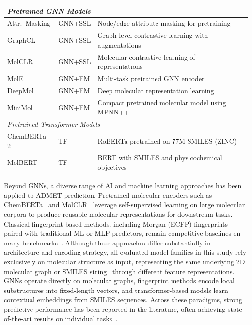 \documentclass[journal]{IEEEtran}
\begin{document}
\begin{table}[!t]
\begin{tabular}{llp{5.5cm}l}
\midrule
\multicolumn{4}{l}{\emph{Pretrained GNN Models}} \\
\midrule
Attr.\ Masking & GNN+SSL & Node/edge attribute masking for pretraining & \cite{attrMasking} \\
GraphCL & GNN+SSL & Graph-level contrastive learning with augmentations & \cite{contrativeLearning} \\
MolCLR & GNN+SSL & Molecular contrastive learning of representations & \cite{molclr} \\
MolE & GNN+FM & Multi-task pretrained GNN encoder & \cite{molE} \\
DeepMol & GNN+FM & Deep molecular representation learning & \cite{deepMol} \\
MiniMol & GNN+FM & Compact pretrained molecular model using MPNN++ & \cite{miniMol} \\

\midrule
\multicolumn{4}{l}{\emph{Pretrained Transformer Models}} \\
\midrule
ChemBERTa-2 & TF & RoBERTa pretrained on 77M SMILES (ZINC) & \cite{chemberta2} \\
MolBERT & TF & BERT with SMILES and physicochemical objectives & \cite{molbert} \\

\bottomrule
\end{tabular}
\end{table}

Beyond GNNs, a diverse range of AI and machine learning approaches has been applied to ADMET prediction. Pretrained molecular encoders such as ChemBERTa~\cite{chemberta2} and MolCLR~\cite{molclr} leverage self-supervised learning on large molecular corpora to produce reusable molecular representations for downstream tasks. Classical fingerprint-based methods, including Morgan (ECFP) fingerprints~\cite{rogers2010ecfp} paired with traditional ML or MLP predictors, remain competitive baselines on many benchmarks~\cite{maplight, rdkit2d_mlp}. Although these approaches differ substantially in architecture and encoding strategy, all evaluated model families in this study rely exclusively on molecular structure as input, representing the same underlying 2D molecular graph or SMILES string~\cite{weininger1988smiles} through different feature representations. GNNs operate directly on molecular graphs, fingerprint methods encode local substructures into fixed-length vectors, and transformer-based models learn contextual embeddings from SMILES sequences. Across these paradigms, strong predictive performance has been reported in the literature, often achieving state-of-the-art results on individual tasks~\cite{huang2021therapeuticsdatacommonsmachine}.
\end{document}
